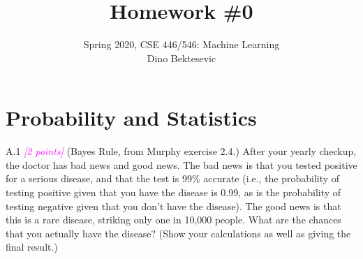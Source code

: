 \documentclass{article}
\date{{}}
\newcommand{\1}{\mathbf{1}}
\newcommand{\points}[1]{\small\textcolor{magenta}{\emph{[#1 points]}} \normalsize}
\begin{document}
\title{Homework \#0 }
\author{\normalsize{Spring 2020, CSE 446/546: Machine Learning}\\
\normalsize{Dino Bektesevic}}
\maketitle


\section*{Probability and Statistics}
A.1 \points{2} (Bayes Rule, from Murphy exercise 2.4.) After your yearly checkup, the doctor has bad news and good news. The bad news is that you tested positive for a serious disease, and that the test is 99\% accurate (i.e., the probability of testing positive given that you have the disease is 0.99, as is the probability of testing negative given that you don't have the disease). The good news is that this is a rare disease, striking only one in 10,000 people. What are the chances that you actually have the disease? (Show your calculations as well as giving the final result.)\\
\end{document}
